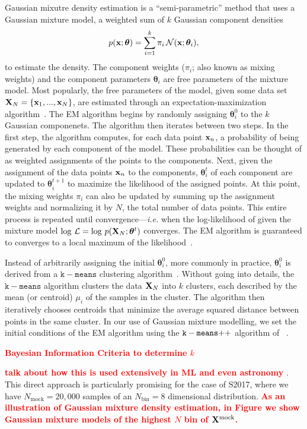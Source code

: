 \documentclass[12pt, letterpaper, preprint]{aastex}
\newcommand{\beq}{\begin{equation}}
\newcommand{\eeq}{\end{equation}}
\newcommand{\todo}[1]{{\bf \textcolor{red}{#1}}}
\newcommand{\Xmock}{{\bf X}^\mathrm{mock}}
\newcommand{\Sinh}{S2017}
\begin{document}
Gaussian mixutre density estimation is a ``semi-parametric'' method 
that uses a Gaussian mixture model, a weighted sum of $k$ Gaussian 
component densities
\beq
p({\bf x}; \bm{\theta}) = \sum\limits_{i=1}^{k} \pi_i\, \mathcal{N}({\bf x}; \bm{\theta}_i),
\eeq
to estimate the density. 
The component weights ($\pi_i$; also known as mixing weights) and the 
component parameters $\bm{\theta}_i$ are free parameters of the mixture 
model. Most popularly, the free parameters of the model, given some data
set ${\bf X}_N = \{{\bf x}_1,..., {\bf x}_N \}$, are estimated 
through an expectation-maximization algorithm~\citep[EM;][]{dempster1977, neal1998}.
The EM algorithm begins by randomly assigning $\bm{\theta}^0_i$ to the 
$k$ Gaussian componenets. The algorithm then iterates between two steps. 
In the first step, the algorithm computes, for each data point ${\bf x}_n$, 
a probability of being generated by each component of the model. These 
probabilities can be thought of as weighted assignments of the points 
to the components. Next, given the assignment of the data points ${\bf x}_n$ to the 
components, $\bm{\theta}^t_i$ of each component are updated to $\bm{\theta}^{t+1}_i$
to maximize the likelihood of the assigned points. At this point, the mixing 
weights $\pi_i$ can also be updated by summing up the assignment weights 
and normalizing it by $N$, the total number of data points. This entire
process is repeated until convergence---\emph{i.e.} when the log-likelihood of 
given the mixture model $\log\,\mathcal{L} = \log\,p({\bf X}_N; \bm{\theta}^t)$ %
converges. The EM algorithm is guaranteed to converges to a local maximum 
of the likelihood~\citep{wu1983}. 

Instead of arbitrarily assigning the initial $\bm{\theta}^0_i$, more
commonly in practice, $\bm{\theta}^0_i$ is derived from a $\mathtt{k-means}$ 
clustering algorithm~\citep{lloyd1982}. Without going into details, the 
$\mathtt{k-means}$ algorithm clusters the data ${\bf X}_N$ into $k$ 
clusters, each described by the mean (or centroid) $\mu_i$ of the
samples in the cluster. The algorithm then iteratively chooses centroids that 
minimize the average squared distance between points in the same cluster.
In our use of Gaussian mixture modelling, we set the initial conditions of 
the EM algorithm using the $\mathtt{k-means}{\tiny ++}$ algorithm of ~\cite{arthur2007}. 

\todo{Bayesian Information Criteria to determine $k$} 


\todo{talk about how this is used extensively in ML and even astronomy} 
\citep[see also references in][]{kuhn2017}. This direct 
approach is particularly promising for the case of \Sinh, where we have
$N_\mathrm{mock} = 20,000$ samples of an $N_\mathrm{bin} = 8$ 
dimensional distribution. \todo{As an illustration of Gaussian mixture 
density estimation, in Figure we show Gaussian mixture models of the 
highest $N$ bin of $\Xmock$.}
\end{document}
